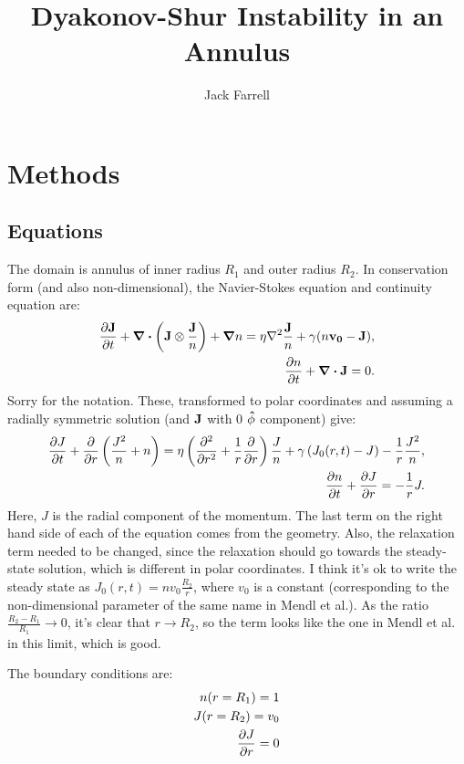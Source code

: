 \documentclass[12pt]{article}
\title{Dyakonov-Shur Instability in an Annulus}
\author{Jack Farrell}
\begin{document}
	\maketitle
	\section{Methods}
	\subsection{Equations}
	The domain is annulus of inner radius $R_1$ and outer radius $R_2$.  In conservation form (and also non-dimensional), the Navier-Stokes equation and continuity equation are:
	\begin{equation}
	\centering
		\begin{split}
			\pdv{\vb{J}}{t} + \div{\left( \vb{J} \otimes \frac{\vb{J}}{n}\right)} +\grad{n} = \eta \laplacian{\frac{\vb{J}}{n}} + \gamma (n\vb{v_0} - \vb{J}), \\
			\pdv{n}{t} + \div{\vb{J}} = 0. \\
		\end{split}
	\end{equation}
	Sorry for the notation. These, transformed to polar coordinates and assuming a radially symmetric solution (and $\vb{J}$ with $0$ $\vu{\phi}$ component) give:
	\begin{equation}
	\begin{split}
			\pdv{J}{t} + \pdv{r}\left(\frac{J^2}{n}+n\right) = \eta \left(\pdv[2]{r} + \frac{1}{r}\pdv{r}\right)\frac{J}{n} + \gamma\left(J_0(r, t) - J\right) - \frac{1}{r}\frac{J^2}{n}, \\
			\pdv{n}{t} + \pdv{J}{r} = -\frac{1}{r}J. \\
	\end{split}
	\end{equation}
	Here, $J$ is the radial component of the momentum.
	The last term on the right hand side of each of the equation comes from the geometry.  Also, the relaxation term needed to be changed, since the relaxation should go towards the steady-state solution, which is different in polar coordinates.  I think it's ok to write the steady state as $J_0(r, t) = nv_0\frac{R_2}{r}$, where $v_0$ is a constant (corresponding to the non-dimensional parameter of the same name in Mendl et al.).  As the ratio $\frac{R_2 - R_1}{R_1} \rightarrow 0$, it's clear that $r \rightarrow R_2$, so the term looks like the one in Mendl et al. in this limit, which is good.
	
	The boundary conditions are:
	\begin{equation}
	\begin{split}
		n(r = R_1) = 1 \\
		J(r = R_2) = v_0 \\
		\pdv{J}{r} (R = R_1) = 0 \\
	\end{split}
	\end{equation}
	
\end{document}
